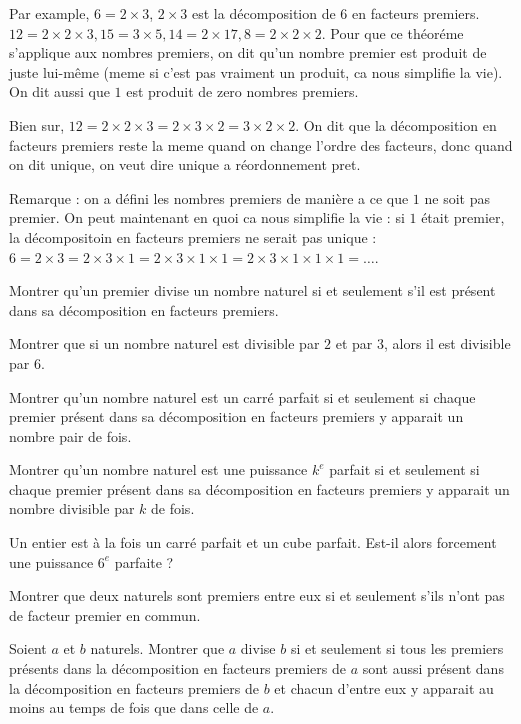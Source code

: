 \endgroup

Par example, \(6 = 2 \times 3\), \(2 \times 3\) est la décomposition de \(6\) en facteurs premiers. \(12 = 2 \times 2 \times 3, 15 = 3 \times 5, 14 = 2 \times 17, 8 = 2 \times 2 \times 2\).
Pour que ce théoréme s'applique aux nombres premiers, on dit qu'un nombre premier est produit de juste lui-même (meme si c'est pas vraiment un produit, ca nous simplifie la vie). On dit aussi que \(1\) est produit de zero nombres premiers.

Bien sur, \(12 = 2 \times 2 \times 3 = 2 \times 3 \times 2 = 3 \times 2 \times 2\). On dit que la décomposition en facteurs premiers reste la meme quand on change l'ordre des facteurs, donc quand on dit unique, on veut dire unique a réordonnement pret.

Remarque : on a défini les nombres premiers de manière a ce que \(1\) ne soit pas premier. On peut maintenant en quoi ca nous simplifie la vie : si \(1\) était premier, la décompositoin en facteurs premiers ne serait pas unique : \(6 = 2 \times 3 = 2 \times 3 \times 1 = 2 \times 3 \times 1 \times 1 = 2 \times 3 \times 1 \times 1 \times 1 = \ldots\).

\exo
Montrer qu'un premier divise un nombre naturel si et seulement s’il est présent dans sa décomposition en facteurs premiers.

\exo
Montrer que si un nombre naturel est divisible par \(2\) et par \(3\), alors il est divisible par \(6\).

\exo

Montrer qu’un nombre naturel est un carré parfait si et seulement si chaque premier présent dans sa décomposition en facteurs premiers y apparait un nombre pair de fois.

Montrer qu’un nombre naturel est une puissance \(k^{e}\) parfait si et seulement si chaque premier présent dans sa décomposition en facteurs premiers y apparait un nombre divisible par \(k\) de fois.

\exo
Un entier est à la fois un carré parfait et un cube parfait.
Est-il alors forcement une puissance \(6^{e}\) parfaite ?

\exo

Montrer que deux naturels sont premiers entre eux si et seulement s’ils n'ont pas de facteur premier en commun.


\exo
Soient \(a\) et \(b\) naturels.
Montrer que \(a\) divise \(b\) si et seulement si tous les premiers présents dans la décomposition en facteurs premiers de \(a\) sont aussi présent dans la décomposition en facteurs premiers de \(b\) et chacun d'entre eux y apparait au moins au temps de fois que dans celle de \(a\).

